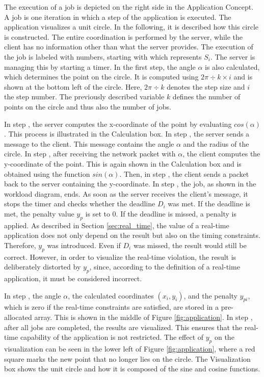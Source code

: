 The execution of a job is depicted on the right side in the Application Concept.  
A job is one iteration in which a step of the application is executed.  
The application visualizes a unit circle.  
In the following, it is described how this circle is constructed.  
The entire coordination is performed by the server, while the client has no information other than what the server provides.  
The execution of the job is labeled with numbers, starting with  which represents $S_i$.
The server is managing this by starting a timer.
In the first step, the angle $\alpha$ is also calculated, which determines the point on the circle.  
It is computed using $2\pi \div k \times i$ and is shown at the bottom left of the circle.  
Here, $2\pi \div k$ denotes the step size and $i$ the step number.  
The previously described variable $k$ defines the number of points on the circle and thus also the number of jobs.  

In step , the server computes the x-coordinate of the point by evaluating $cos(\alpha)$.  
This process is illustrated in the Calculation box.  
In step , the server sends a message to the client.  
This message contains the angle $\alpha$ and the radius of the circle.  
In step , after receiving the network packet with $\alpha$, the client computes the y-coordinate of the point.  
This is again shown in the Calculation box and is obtained using the function $sin(\alpha)$.  
Then, in step , the client sends a packet back to the server containing the y-coordinate.  
In step , the job, as shown in the workload diagram, ends.  
As soon as the server receives the client’s message, it stops the timer and checks whether the deadline $D_i$ was met.  
If the deadline is met, the penalty value $y_p$ is set to 0.  
If the deadline is missed, a penalty is applied.  
As described in Section \ref{sec:real_time}, the value of a real-time application does not only depend on the result but also on the timing constraints.  
Therefore, $y_p$ was introduced.  
Even if $D_i$ was missed, the result would still be correct.  
However, in order to visualize the real-time violation, the result is deliberately distorted by $y_p$, since, according to the definition of a real-time application, it must be considered incorrect.  

In step , the angle $\alpha$, the calculated coordinates $(x_i, y_i)$, and the penalty $y_{pi}$, which is zero if the real-time constraints are satisfied, are stored in a pre-allocated array.  
This is shown in the middle of Figure \ref{fig:application}.  
In step , after all jobs are completed, the results are visualized.  
This ensures that the real-time capability of the application is not restricted.  
The effect of $y_p$ on the visualization can be seen in the lower left of Figure \ref{fig:application}, where a red square marks the new point that no longer lies on the circle.  
The Visualization box shows the unit circle and how it is composed of the sine and cosine functions.  

